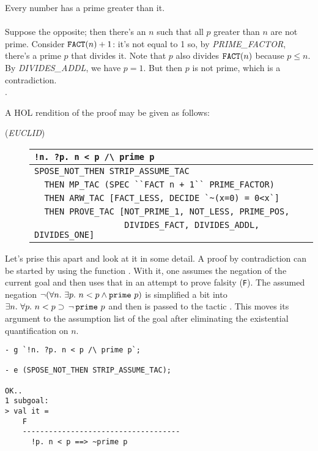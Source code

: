  Every number has a prime greater than it.\\
 \\
\noindent Suppose the opposite; then there's an $n$
such that all $p$ greater than $n$ are not prime. Consider $\mbox{\tt
FACT}(n) + 1$: it's not equal to 1 so, by {\small{\it PRIME\_FACTOR}},
there's a prime $p$ that divides it. Note that $p$ also divides
$\mbox{\tt FACT}(n)$ because $p \leq n$. By {\small{\it DIVIDES\_ADDL}},
we have $p=1$. But then $p$ is not prime, which is a contradiction. \\
.

A HOL rendition of the proof may be given as follows:
\begin{description}
\item [\small{({\it EUCLID\/})}]
\begin{tabular}[t]{l}
\verb+!n. ?p. n < p /\ prime p+ \\ \hline
\verb+SPOSE_NOT_THEN STRIP_ASSUME_TAC+ \\
\verb!  THEN MP_TAC (SPEC ``FACT n + 1`` PRIME_FACTOR)! \\
\verb+  THEN ARW_TAC [FACT_LESS, DECIDE `~(x=0) = 0<x`]+ \\
\verb+  THEN PROVE_TAC [NOT_PRIME_1, NOT_LESS, PRIME_POS, + \\
\verb+                  DIVIDES_FACT, DIVIDES_ADDL, DIVIDES_ONE]+ \\
\end{tabular}
\end{description}
Let's prise this apart and look at it in some detail. A proof by
contradiction can be started by using the  function
. With it, one assumes the negation of the
current goal and then uses that in an attempt to prove falsity
(\verb+F+). The assumed negation $\neg(\forall n.\ \exists p.\ n < p
\land \mbox{\tt prime}\ p)$ is simplified a bit into $\exists n.\
\forall p.\ n < p \supset \, \neg \,\mbox{\tt prime}\ p$ and then is
passed to the tactic \ml{STRIP\_ASSUME\_TAC}. This moves its argument
to the assumption list of the goal after eliminating the existential
quantification on $n$.
\begin{session}\begin{verbatim}
- g `!n. ?p. n < p /\ prime p`;

- e (SPOSE_NOT_THEN STRIP_ASSUME_TAC);

OK..
1 subgoal:
> val it =
    F
    ------------------------------------
      !p. n < p ==> ~prime p
\end{verbatim}\end{session}
